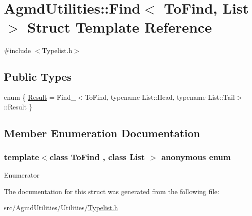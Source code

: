 \hypertarget{struct_agmd_utilities_1_1_find}{\section{Agmd\+Utilities\+:\+:Find$<$ To\+Find, List $>$ Struct Template Reference}
\label{struct_agmd_utilities_1_1_find}
}


{\ttfamily \#include $<$Typelist.\+h$>$}

\subsection*{Public Types}
\begin{DoxyCompactItemize}
\item 
enum \{ \hyperlink{struct_agmd_utilities_1_1_find_a24cc78cd7dbe4bfb91591276f2b152a8ae0015049d22c26b13488bc7a7dd6b750}{Result} = Find\+\_\+$<$To\+Find, typename List\+:\+:Head, typename List\+:\+:Tail$>$\+:\+:Result
 \}
\end{DoxyCompactItemize}


\subsection{Member Enumeration Documentation}
\hypertarget{struct_agmd_utilities_1_1_find_a24cc78cd7dbe4bfb91591276f2b152a8}{\subsubsection[{anonymous enum}]{\setlength{\rightskip}{0pt plus 5cm}template$<$class To\+Find , class List $>$ anonymous enum}}\label{struct_agmd_utilities_1_1_find_a24cc78cd7dbe4bfb91591276f2b152a8}
\begin{Desc}
\item[Enumerator]\par
\begin{description}
\item[{\em 
\hypertarget{struct_agmd_utilities_1_1_find_a24cc78cd7dbe4bfb91591276f2b152a8ae0015049d22c26b13488bc7a7dd6b750}{Result}\label{struct_agmd_utilities_1_1_find_a24cc78cd7dbe4bfb91591276f2b152a8ae0015049d22c26b13488bc7a7dd6b750}
}]\end{description}
\end{Desc}


The documentation for this struct was generated from the following file\+:\begin{DoxyCompactItemize}
\item 
src/\+Agmd\+Utilities/\+Utilities/\hyperlink{_typelist_8h}{Typelist.\+h}\end{DoxyCompactItemize}
